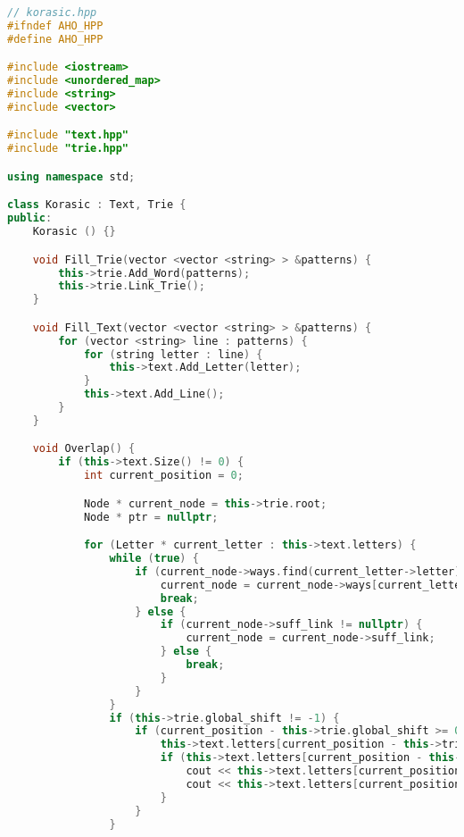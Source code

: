\pagebreak

\begin{lstlisting}[language=C++]
// korasic.hpp
#ifndef AHO_HPP
#define AHO_HPP

#include <iostream>
#include <unordered_map>
#include <string>
#include <vector>

#include "text.hpp"
#include "trie.hpp"

using namespace std;

class Korasic : Text, Trie {
public:
    Korasic () {}

    void Fill_Trie(vector <vector <string> > &patterns) {
        this->trie.Add_Word(patterns);
        this->trie.Link_Trie();
    }

    void Fill_Text(vector <vector <string> > &patterns) {
        for (vector <string> line : patterns) {
            for (string letter : line) {
                this->text.Add_Letter(letter);
            }
            this->text.Add_Line();
        }
    }

    void Overlap() {
        if (this->text.Size() != 0) {
            int current_position = 0;

            Node * current_node = this->trie.root;
            Node * ptr = nullptr;

            for (Letter * current_letter : this->text.letters) {
                while (true) {
                    if (current_node->ways.find(current_letter->letter) != current_node->ways.end()) {
                        current_node = current_node->ways[current_letter->letter];
                        break;
                    } else {
                        if (current_node->suff_link != nullptr) {
                            current_node = current_node->suff_link;
                        } else {
                            break;
                        }
                    }
                }
                if (this->trie.global_shift != -1) {
                    if (current_position - this->trie.global_shift >= 0) {
                        this->text.letters[current_position - this->trie.global_shift]->overlap += 1;
                        if (this->text.letters[current_position - this->trie.global_shift]->overlap == this->trie.word_counter + 1) {
                            cout << this->text.letters[current_position - this->trie.global_shift]->line << ", ";
                            cout << this->text.letters[current_position - this->trie.global_shift]->column << "\n";
                        }
                    }
                }


\end{lstlisting}
